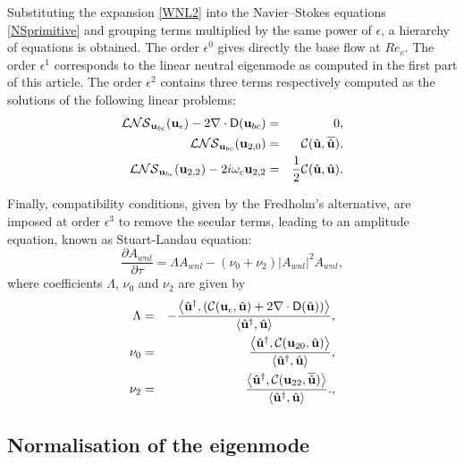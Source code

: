 \documentclass[twocolumn,10pt]{asme2ej}
\newcommand{\be}[1]{ \begin{equation} \label{#1}}
\newcommand{\ee}{\end{equation}}
\begin{document}
Substituting the expansion \eqref{WNL2} into the Navier--Stokes equations \eqref{NSprimitive} and grouping terms multiplied by the same power of $\epsilon$, a hierarchy of equations is obtained. The order $\epsilon^0$ gives directly the base flow at $Re_c$. The order $\epsilon^1$
corresponds to the linear neutral eigenmode as computed in the first part of this article.
The order $\epsilon^2$ contains three terms respectively computed as the solutions of the following linear problems:
\begin{eqnarray}
 {\cal LNS}_{{\bf u}_{bc}} ({\bf u}_\epsilon) - 2 \nabla \cdot {\mathsf D}({\bf u}_{bc}) &=&0,
\label{eq:LL1} \\
{\cal LNS}_{{\bf u}_{bc}} ({\bf u}_{2,0}) &=& {\cal C}(\hat{\bf u},\overline{\hat{\bf u}}), \label{eq:LL2} \\
{\cal LNS}_{{\bf u}_{bc}} ({\bf u}_{2,2}) - 2 i \omega_c {\bf u}_{2,2}  &=& \frac{1}{2} {\cal C}(\hat{\bf u},\hat{\bf u}). \label{eq:LL3}
 \end{eqnarray}

Finally, compatibility conditions, given by the Fredholm's alternative, are imposed at order $\epsilon^3$ to remove the secular terms, leading to an amplitude equation, known as Stuart-Landau equation:
\be{WNL3_2}
\frac{\partial A_{wnl}}{\partial \tau} = \Lambda A_{wnl} - (\nu_0+\nu_2)  |A_{wnl}|^2 A_{wnl},
\ee
where coefficients $\Lambda$, $\nu_0$ and $\nu_2$ are given by
\begin{eqnarray}
\Lambda &=& -\frac{ \left< {\hat{\bf u}}^\dag, 
\left( {\cal C}({\bf u}_\epsilon, \hat{\bf u}) + 2 \nabla \cdot  {\mathsf D}( \hat{\bf u}) \right) \right>}
{  \left<  \hat{\bf u}^\dag,\hat{\bf u} \right> },\label{LAMBDA}\\
\nu_0 &=& \frac{ \left< {\hat{\bf u}}^\dag,  {\cal C}({\bf u}_{20}, \hat{\bf u} ) \right>}
{  \left<  \hat{\bf u}^\dag,\hat{\bf u} \right> },\label{NU0}\\
\nu_2 &=& \frac{ \left< {\hat{\bf u}}^\dag,  {\cal C}({\bf u}_{22}, \overline{\hat{\bf u}})  \right>}
{  \left<  \hat{\bf u}^\dag,\hat{\bf u} \right> }.,\label{NU2}
 \end{eqnarray}


\subsection{Normalisation of the eigenmode}
\end{document}
